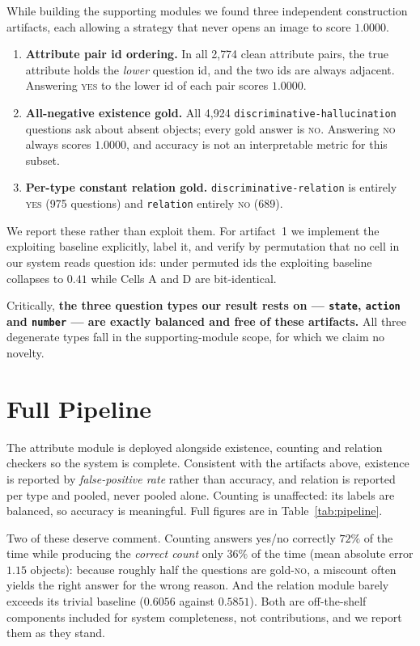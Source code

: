 \documentclass[conference]{IEEEtran}
\begin{document}
While building the supporting modules we found three independent construction
artifacts, each allowing a strategy that never opens an image to score $1.0000$.

\begin{enumerate}
\item \textbf{Attribute pair id ordering.} In all 2{,}774 clean attribute pairs,
      the true attribute holds the \emph{lower} question id, and the two ids are
      always adjacent. Answering \textsc{yes} to the lower id of each pair scores
      $1.0000$.
\item \textbf{All-negative existence gold.} All 4{,}924
      \texttt{discriminative-hallucination} questions ask about absent objects;
      every gold answer is \textsc{no}. Answering \textsc{no} always scores
      $1.0000$, and accuracy is not an interpretable metric for this subset.
\item \textbf{Per-type constant relation gold.} \texttt{discriminative-relation}
      is entirely \textsc{yes} (975 questions) and \texttt{relation} entirely
      \textsc{no} (689).
\end{enumerate}

We report these rather than exploit them. For artifact~1 we implement the
exploiting baseline explicitly, label it, and verify by permutation that no cell
in our system reads question ids: under permuted ids the exploiting baseline
collapses to $0.41$ while Cells A and D are bit-identical.

Critically, \textbf{the three question types our result rests on ---
\texttt{state}, \texttt{action} and \texttt{number} --- are exactly balanced and
free of these artifacts.} All three degenerate types fall in the supporting-module
scope, for which we claim no novelty.

\section{Full Pipeline}

The attribute module is deployed alongside existence, counting and relation
checkers so the system is complete. Consistent with the artifacts above,
existence is reported by \emph{false-positive rate} rather than accuracy, and
relation is reported per type and pooled, never pooled alone. Counting is
unaffected: its labels are balanced, so accuracy is meaningful. Full figures are
in Table~\ref{tab:pipeline}.

Two of these deserve comment. Counting answers yes/no correctly $72\%$ of the
time while producing the \emph{correct count} only $36\%$ of the time (mean
absolute error $1.15$ objects): because roughly half the questions are gold-\textsc{no},
a miscount often yields the right answer for the wrong reason. And the relation
module barely exceeds its trivial baseline ($0.6056$ against $0.5851$). Both are
off-the-shelf components included for system completeness, not contributions, and
we report them as they stand.
\end{document}
